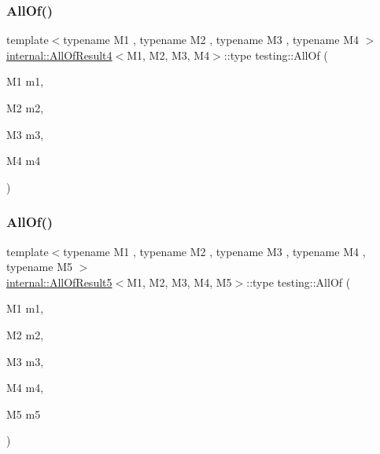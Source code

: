 \subsubsection{\texorpdfstring{All\+Of()}{AllOf()}\hspace{0.1cm}{\footnotesize\ttfamily [3/9]}}
{\footnotesize\ttfamily template$<$typename M1 , typename M2 , typename M3 , typename M4 $>$ \\
\hyperlink{structtesting_1_1internal_1_1_all_of_result4}{internal\+::\+All\+Of\+Result4}$<$M1, M2, M3, M4$>$\+::type testing\+::\+All\+Of (\begin{DoxyParamCaption}\item[{M1}]{m1,  }\item[{M2}]{m2,  }\item[{M3}]{m3,  }\item[{M4}]{m4 }\end{DoxyParamCaption})\hspace{0.3cm}{\ttfamily [inline]}}

\mbox{\label{namespacetesting_ab8f5e6cf1c22acf51a2b9b376b0ef03a}} 
\subsubsection{\texorpdfstring{All\+Of()}{AllOf()}\hspace{0.1cm}{\footnotesize\ttfamily [4/9]}}
{\footnotesize\ttfamily template$<$typename M1 , typename M2 , typename M3 , typename M4 , typename M5 $>$ \\
\hyperlink{structtesting_1_1internal_1_1_all_of_result5}{internal\+::\+All\+Of\+Result5}$<$M1, M2, M3, M4, M5$>$\+::type testing\+::\+All\+Of (\begin{DoxyParamCaption}\item[{M1}]{m1,  }\item[{M2}]{m2,  }\item[{M3}]{m3,  }\item[{M4}]{m4,  }\item[{M5}]{m5 }\end{DoxyParamCaption})\hspace{0.3cm}{\ttfamily [inline]}}

\mbox{\label{namespacetesting_afc8e2d405f80e7d3df32842ddb648125}} 
